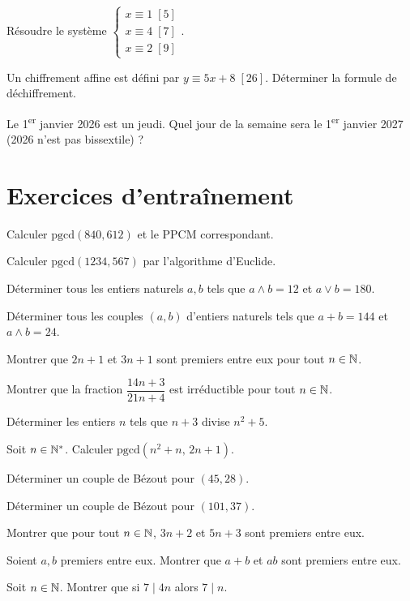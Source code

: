 \exo{} Résoudre le système $\begin{cases}x\equiv1\;[5]\\ x\equiv4\;[7]\\ x\equiv2\;[9]\end{cases}$.

\exo{} Un chiffrement affine est défini par $y\equiv5x+8\;[26]$. Déterminer la formule de déchiffrement.

\exo{} Le 1\textsuperscript{er} janvier 2026 est un jeudi. Quel jour de la semaine sera le 1\textsuperscript{er} janvier 2027 (2026 n'est pas bissextile) ?

\section{Exercices d'entraînement}

\exo{} Calculer $\mathrm{pgcd}(840,612)$ et le PPCM correspondant.

\exo{} Calculer $\mathrm{pgcd}(1234,567)$ par l'algorithme d'Euclide.

\exo{} Déterminer tous les entiers naturels $a,b$ tels que $a\wedge b=12$ et $a\vee b=180$.

\exo{} Déterminer tous les couples $(a,b)$ d'entiers naturels tels que $a+b=144$ et $a\wedge b=24$.

\exo{} Montrer que $2n+1$ et $3n+1$ sont premiers entre eux pour tout $n\in\mathbb{N}$.

\exo{} Montrer que la fraction $\dfrac{14n+3}{21n+4}$ est irréductible pour tout $n\in\mathbb{N}$.

\exo{} Déterminer les entiers $n$ tels que $n+3$ divise $n^2+5$.

\exo{} Soit $n\in\mathbb{N}^*$. Calculer $\mathrm{pgcd}(n^2+n,\,2n+1)$.

\exo{} Déterminer un couple de Bézout pour $(45,28)$.

\exo{} Déterminer un couple de Bézout pour $(101,37)$.

\exo{} Montrer que pour tout $n\in\mathbb{N}$, $3n+2$ et $5n+3$ sont premiers entre eux.

\exo{} Soient $a,b$ premiers entre eux. Montrer que $a+b$ et $ab$ sont premiers entre eux.

\exo{} Soit $n\in\mathbb{N}$. Montrer que si $7\mid 4n$ alors $7\mid n$.

